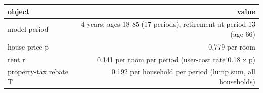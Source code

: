 \begingroup\small
\setlength{\tabcolsep}{3pt}
\renewcommand{\arraystretch}{1.04}
\begin{tabularx}{\linewidth}{Xr}
\toprule
object & value \\
\midrule
model period & 4 years; ages 18-85 (17 periods), retirement at period 13 (age 66) \\
house price p & 0.779 per room \\
rent r & 0.141 per room per period (user-cost rate 0.18 x p) \\
property-tax rebate T & 0.192 per household per period (lump sum, all households) \\
\bottomrule
\end{tabularx}
\endgroup
